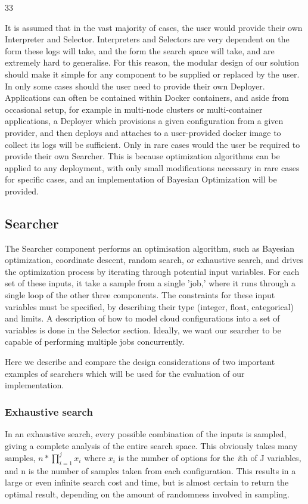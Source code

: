 33\documentclass{article}
\begin{document}
It is assumed that in the vast majority of cases, the user would provide their own Interpreter and Selector. Interpreters and Selectors are very dependent on the form these logs will take, and the form the search space will take, and are extremely hard to generalise. For this reason, the modular design of our solution should make it simple for any component to be supplied or replaced by the user. In only some cases should the user need to provide their own Deployer. Applications can often be contained within Docker containers, and aside from occasional setup, for example in multi-node clusters or multi-container applications, a Deployer which provisions a given configuration from a given provider, and then deploys and attaches to a user-provided docker image to collect its logs will be sufficient.  Only in rare cases would the user be required to provide their own Searcher. This is because optimization algorithms can be applied to any deployment, with only small modifications necessary in rare cases for specific cases, and an implementation of Bayesian Optimization will be provided.

\subsection{Searcher}
The Searcher component performs an optimisation algorithm, such as Bayesian optimization, coordinate descent, random search, or exhaustive search, and drives the optimization process by iterating through potential input variables. For each set of these inputs, it take a sample from a single 'job,' where it runs through a single loop of the other three components. The constraints for these input variables must be specified, by describing their type (integer, float, categorical) and limits. A description of how to model cloud configurations into a set of variables is done in the Selector section. Ideally, we want our searcher to be capable of performing multiple jobs concurrently.

Here we describe and compare the design considerations of two important examples of searchers which will be used for the evaluation of our implementation.

\subsubsection{Exhaustive search}
In an exhaustive search, every possible combination of the inputs is sampled, giving a complete analysis of the entire search space. This obviously takes many samples, $n * \prod_{i=1}^{j} x_{i}$ where $x_{i}$ is the number of options for the \textit{i}th of J variables, and n is the number of samples taken from each configuration. This results in a large or even infinite search cost and time, but is almost certain to return the optimal result, depending on the amount of randomness involved in sampling.
\end{document}
